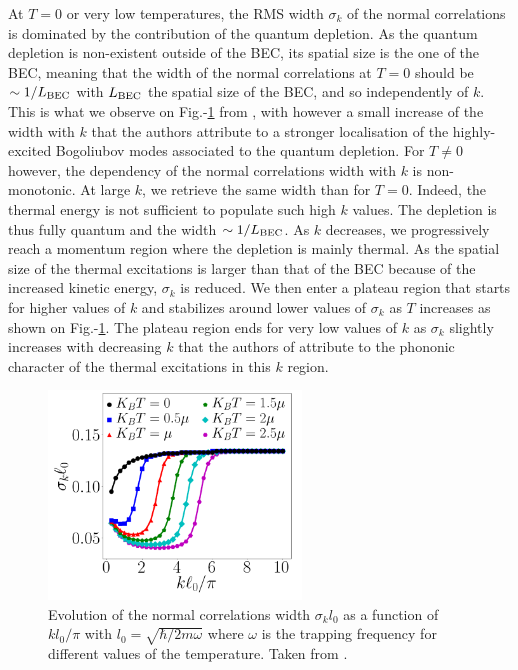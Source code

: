 At $T=0$ or very low temperatures, the RMS width $\sigma_k$ of the normal correlations is dominated by the contribution of the quantum depletion. As the quantum depletion is non-existent outside of the BEC, its spatial size is the one of the BEC, meaning that the width of the normal correlations at $T=0$ should be $\sim 1/L_{\rm{BEC}}$ with $L_{\rm{BEC}}$ the spatial size of the BEC, and so independently of $k$. This is what we observe on Fig.-\ref{fig:butera_kk} from \cite{butera2020}, with however a small increase of the width with $k$ that the authors attribute to a stronger localisation of the highly-excited Bogoliubov modes associated to the quantum depletion.
For $T \neq 0$ however, the dependency of the normal correlations width with $k$ is non-monotonic. At large $k$, we retrieve the same width than for $T=0$. Indeed, the thermal energy is not sufficient to populate such high $k$ values. The depletion is thus fully quantum and the width $\sim 1/L_{\rm{BEC}}$. As $k$ decreases, we progressively reach a momentum region where the depletion is mainly thermal. As the spatial size of the thermal excitations is larger than that of the BEC because of the increased kinetic energy, $\sigma_k$ is reduced. We then enter a plateau region that starts for higher values of $k$ and stabilizes around lower values of $\sigma_k$ as $T$ increases as shown on Fig.-\ref{fig:butera_kk}. The plateau region ends for very low values of $k$ as $\sigma_k$ slightly increases with decreasing $k$ that the authors of \cite{butera2020} attribute to the phononic character of the thermal excitations in this $k$ region.


\begin{figure}
    \centering
    \includegraphics[width=0.6\textwidth]{Fig/Chapter1/butera.png}
    \caption[Evolution of normal correlations width with $k$ for different values of the temperature]{Evolution of the normal correlations width $\sigma_k l_0$ as a function of $k l_0/\pi$ with $l_0=\sqrt{\hbar/2m \omega}$ where $\omega$ is the trapping frequency for different values of the temperature. Taken from \cite{butera2020}.}
    \label{fig:butera_kk}
\end{figure}

